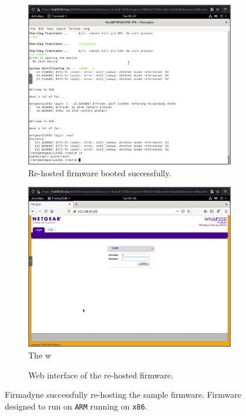 \begin{figure}[H]
     \centering
     \begin{subfigure}[b]{0.45\textwidth}
         \centering
         \includegraphics[width=\textwidth]{figs/sucess.png}
         \caption{Re-hosted firmware booted successfully.}
         \label{fig:qemu-sucess1}
     \end{subfigure}
     \hfill
     \begin{subfigure}[b]{0.45\textwidth}
         \centering
         \includegraphics[width=\textwidth]{figs/sucess2.png}
     The w    \caption{Web interface of the re-hosted firmware.}
         \label{fig:qemu-sucess2}
     \end{subfigure}
        \caption{Firmadyne successfully re-hosting the sample firmware. Firmware designed to run on {\tt ARM} running on {\tt x86}.}
        \label{fig:emulated-sucess}
\end{figure}

